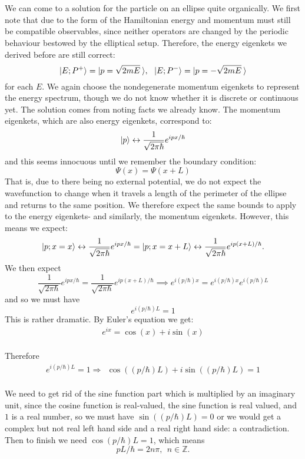 \\\\
We can come to a solution for the particle on an ellipse quite organically. We first note that due to the form of the Hamiltonian energy and momentum must still be compatible observables, since neither operators are changed by the periodic behaviour bestowed by the elliptical setup. Therefore, the energy eigenkets we derived before are still correct:
$$
|E;P^{+}\rangle=|p=\sqrt{2mE}\:\rangle, \:\:\: |E;P^{-}\rangle=|p=-\sqrt{2mE}\:\rangle
$$
for each $E$. We again choose the nondegenerate momentum eigenkets to represent the energy spectrum, though we do not know whether it is discrete or continuous yet. The solution comes from noting facts we already know. The momentum eigenkets, which are also energy eigenkets, correspond to:
$$
|p\rangle\leftrightarrow\frac{1}{\sqrt{2\pi\hbar}}e^{ipx/\hbar}
$$
and this seems innocuous until we remember the boundary condition: 
$$
\Psi(x)=\Psi(x+L)
$$
That is, due to there being no external potential, we do not expect the wavefunction to change when it travels a length of the perimeter of the ellipse and returns to the same position. We therefore expect the same bounds to apply to the energy eigenkets- and similarly, the momentum eigenkets. However, this means we expect:
$$
|p; x=x\rangle\leftrightarrow\frac{1}{\sqrt{2\pi\hbar}}e^{ipx/\hbar}= |p; x=x+L\rangle\leftrightarrow\frac{1}{\sqrt{2\pi\hbar}}e^{ip(x+L)/\hbar}.
$$
We then expect 
$$
\frac{1}{\sqrt{2\pi\hbar}}e^{ipx/\hbar}=\frac{1}{\sqrt{2\pi\hbar}}e^{ip(x+L)/\hbar} \implies e^{i(p/\hbar)x}=e^{i(p/\hbar)x}e^{i(p/\hbar)L}
$$
and so we must have 
$$
e^{i(p/\hbar)L}=1
$$
This is rather dramatic. By Euler's equation we get:
$$
\begin{aligned}
e^{ix} = \cos(x) + i\sin(x)
\end{aligned}
$$
\\
Therefore
$$
\begin{aligned}
e^{i(p/\hbar)L} = 1 \Rightarrow\:\: \cos((p/\hbar)L) + i\sin((p/\hbar)L)=1
\end{aligned}
$$
\\
We need to get rid of the sine function part which is multiplied by an imaginary unit, since the cosine function is real-valued, the sine function is real valued, and $1$ is a real number, so we must have $\sin((p/\hbar)L)=0$ or we would get a complex but not real
left hand side and a real right hand side: a contradiction. Then to finish we need $\cos{(p/\hbar)L}=1$, which means 
$$
pL/\hbar=2n\pi, \:\: n\in\mathbb{Z}.
$$

